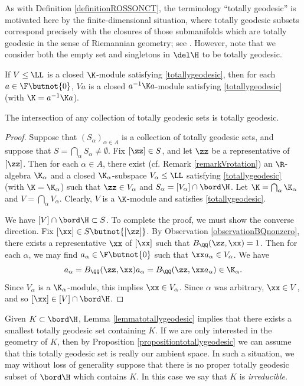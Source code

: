 \begin{remark}
As with Definition \ref{definitionROSSONCT}, the terminology ``totally geodesic'' is motivated here by the finite-dimensional situation, where totally geodesic subsets correspond precisely with the closures of those submanifolds which are totally geodesic in the sense of Riemannian geometry; see \cite[Proposition A.4 and A.7]{Quint}. However, note that we consider both the empty set and singletons in $\del\H$ to be totally geodesic.
\end{remark}

\begin{remark}
\label{remarkVrotation}
If $V\leq\LL$ is a closed $\K$-module satisfying \eqref{totallygeodesic}, then for each $a\in\F\butnot\{0\}$, $Va$ is a closed $a^{-1}\K a$-module satisfying \eqref{totallygeodesic} (with $\K = a^{-1}\K a$).
\end{remark}


\begin{lemma}
\label{lemmatotallygeodesic}
The intersection of any collection of totally geodesic sets is totally geodesic.
\end{lemma}
\begin{proof}
Suppose that $(S_\alpha)_{\alpha\in A}$ is a collection of totally geodesic sets, and suppose that $S = \bigcap_\alpha S_\alpha\neq\emptyset$. Fix $[\zz]\in S$, and let $\zz$ be a representative of $[\zz]$. Then for each $\alpha\in A$, there exist (cf. Remark \ref{remarkVrotation}) an $\R$-algebra $\K_\alpha$ and a closed $\K_\alpha$-subspace $V_\alpha \leq \LL$ satisfying \eqref{totallygeodesic} (with $\K = \K_\alpha$) such that $\zz\in V_\alpha$ and $S_\alpha = [V_\alpha]\cap\bord\H$. Let $\K = \bigcap_\alpha\K_\alpha$ and $V = \bigcap_\alpha V_\alpha$. Clearly, $V$ is a $\K$-module and satisfies \eqref{totallygeodesic}.

We have $[V]\cap\bord\H\subset S$. To complete the proof, we must show the converse direction. Fix $[\xx]\in S\butnot\{[\zz]\}$. By Observation \ref{observationBQnonzero}, there exists a representative $\xx$ of $[\xx]$ such that $B_\QQ(\zz,\xx) = 1$. Then for each $\alpha$, we may find $a_\alpha\in\F\butnot\{0\}$ such that $\xx a_\alpha\in V_\alpha$. We have
\[
a_\alpha = B_\QQ(\zz,\xx)a_\alpha = B_\QQ(\zz,\xx a_\alpha)\in\K_\alpha.
\]
Since $V_\alpha$ is a $\K_\alpha$-module, this implies $\xx\in V_\alpha$. Since $\alpha$ was arbitrary, $\xx\in V$, and so $[\xx]\in[V]\cap\bord\H$.
\end{proof}
\begin{remark}
Given $K\subset\bord\H$, Lemma \ref{lemmatotallygeodesic} implies that there exists a smallest totally geodesic set containing $K$. If we are only interested in the geometry of $K$, then by Proposition \ref{propositiontotallygeodesic} we can assume that this totally geodesic set is really our ambient space. In such a situation, we may without loss of generality suppose that there is no proper totally geodesic subset of $\bord\H$ which contains $K$. In this case we say that $K$ is \emph{irreducible}.
\end{remark}

